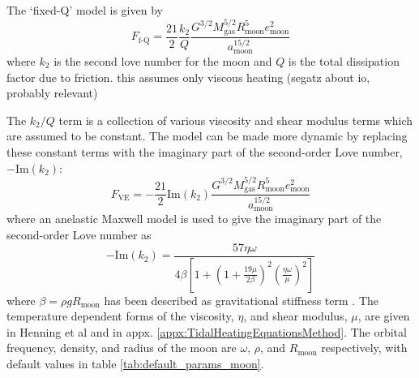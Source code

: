 \documentclass[12pt, onecolumn]{revtex4-2}    %
\begin{document}
The `fixed-Q' model is given by
\begin{equation}
  F_\text{f-Q} = \frac{21}{2} \frac{k_2}{Q} \frac{G^{3/2} M_\text{gas}^{5/2} R_\text{moon}^5 e_\text{moon}^2} {a_\text{moon}^{15/2}}
\end{equation}
where $k_2$ is the second love number for the moon and $Q$ is the total dissipation factor due to friction.
this assumes only viscous heating (segatz about io, probably relevant)

The $k_2 / Q$ term is a collection of various viscosity and shear modulus terms which are assumed to be constant.
The model can be made more dynamic by replacing these constant terms with the imaginary part of the second-order Love number, $-\text{Im}(k_2)$:
\begin{equation}
  F_\text{VE} = -\frac{21}{2} \text{Im}(k_2) \frac{G^{3/2} M_\text{gas}^{5/2} R_\text{moon}^5 e_\text{moon}^2} {a_\text{moon}^{15/2}}
\end{equation}
where an anelastic Maxwell model is used to give the imaginary part of the second-order Love number as
\begin{equation}
  -\text{Im}(k_2) = \frac{57 \eta \omega} {4 \beta \left[ 1 
  + \left(1 + \frac{19 \mu}{2 \beta}\right)^2 
  \left(\frac{\eta \omega}{\mu}\right)^2 
  \right]}
\end{equation}
where $\beta = \rho g R_\text{moon}$ has been described as gravitational stiffness term \cite{Henning2009}.
The temperature dependent forms of the viscosity, $\eta$, and shear modulus, $\mu$, are given in Henning et al \cite{Henning2009} and in appx. \ref{appx:TidalHeatingEquationsMethod}. 
The orbital frequency, density, and radius of the moon are $\omega$, $\rho$, and $R_\text{moon}$ respectively, with default values in table \ref{tab:default_params_moon}.


\cite{DHT2015}
\cite{RN21}
\end{document}
